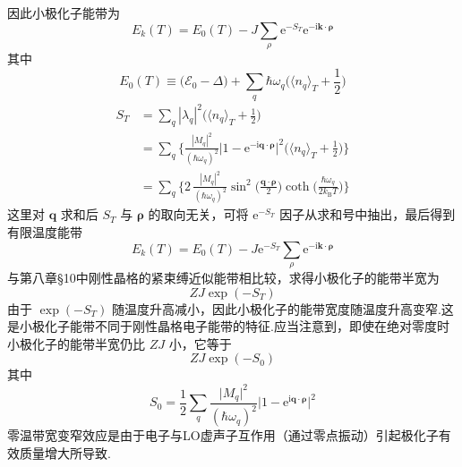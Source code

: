 因此小极化子能带为
\begin{equation}
  E_{k}(T)=E_{0}(T)-J\sum_{\rho}\mathrm{e}^{-S_{T}}
  \mathrm{e}^{-\mathrm{i}\boldsymbol{k}\cdot\boldsymbol{\rho}}
\end{equation}
其中
\begin{equation}
  E_{0}(T)\equiv\bigl(\mathscr{E}_{0}-\Delta\bigr)
  +\sum_{q}\hbar\omega_{q}\biggl(\langle n_{q}\rangle_{T}
  +\frac{1}{2}\biggr)
\end{equation}
\begin{equation}
\begin{aligned}
  S_{T}&=\sum_{q}|\lambda_{q}|^{2}
  \biggl(\langle n_{q}\rangle_{T}+\frac{1}{2}\biggr)\\
  &=\sum_{q}\biggl\{\frac{|M_{q}|^{2}}{\left(\hbar\omega_{q}\right)^{2}}
  \bigl|1-\mathrm{e}^{-\mathrm{i}\boldsymbol{q}\cdot\boldsymbol{\rho}}\bigr|^{2}
  \biggl(\langle n_{q}\rangle_{T}+\frac{1}{2}\biggr)\biggr\}\\
  &=\sum_{q}\biggl\{2\,\frac{|M_{q}|^{2}}{\left(\hbar\omega_{q}\right)^{2}}
  \sin^{2}\biggl(\frac{\boldsymbol{q}\cdot\boldsymbol{\rho}}{2}\biggr)
  \coth\biggl(\frac{\hbar\omega_{q}}{2k_{\mathrm B}T}\biggr)\biggr\}
\end{aligned}
\end{equation}
这里对 $\boldsymbol{q}$ 求和后 $S_{T}$ 与 $\boldsymbol{\rho}$ 的取向无关，可将 $\mathrm{e}^{-S_{T}}$ 因子从求和号中抽出，最后得到有限温度能带
\begin{equation}
  E_{k}(T)=E_{0}(T)-J\mathrm{e}^{-S_{T}}
  \sum_{\rho}\mathrm{e}^{-\mathrm{i}\boldsymbol{k}\cdot\boldsymbol{\rho}}
\end{equation}
与第八章§10中刚性晶格的紧束缚近似能带相比较，求得小极化子的能带半宽为
\begin{equation}
  ZJ\exp\left(-S_{T}\right)
\end{equation}
由于 $\exp\left(-S_{T}\right)$ 随温度升高减小，因此小极化子的能带宽度随温度升高变窄.这是小极化子能带不同于刚性晶格电子能带的特征.应当注意到，即使在绝对零度时小极化子的能带半宽仍比 $ZJ$ 小，它等于
\begin{equation*}
  ZJ\exp\left(-S_{0}\right)
\end{equation*}
其中
\begin{equation*}
  S_{0}=\frac{1}{2}\sum_{q}
  \frac{\bigl|M_{q}\bigr|^{2}}{\left(\hbar\omega_{q}\right)^{2}}
  \bigl|1-\mathrm{e}^{\mathrm{i}\boldsymbol{q}\cdot\boldsymbol{\rho}}\bigr|^{2}
\end{equation*}
零温带宽变窄效应是由于电子与LO虚声子互作用（通过零点振动）引起极化子有效质量增大所导致.

